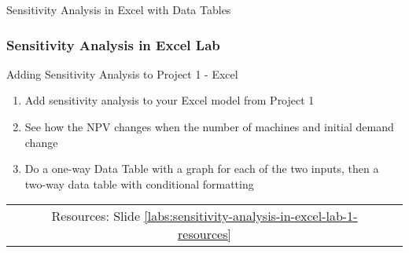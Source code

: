 \documentclass[handout, 11pt]{beamer}
\begin{document}
\begin{section}[SA Excel]{Sensitivity Analysis in Excel with Data Tables}
\begin{frame}
\frametitle{Sensitivity Analysis in Excel Lab}
{
\begin{block}{Adding Sensitivity Analysis to Project 1 - Excel}
\begin{enumerate}
\item Add sensitivity analysis to your Excel model from Project 1
\item See how the NPV changes when the number of machines and initial demand change
\item Do a one-way Data Table with a graph for each of the two inputs, then a two-way data table with conditional formatting
\end{enumerate}
\vfill
\begin{tabular*}{\textwidth}{@{\extracolsep{\fill}}ccc}
\toprule
\hfill & Resources: Slide \textcolor{blue}{\underline{\ref{labs:sensitivity-analysis-in-excel-lab-1-resources}}} & \hfill\\

\end{tabular*}
\end{block}
}
\label{labs:sensitivity-analysis-in-excel-lab-1}
\end{frame}
\end{section}
\end{document}
